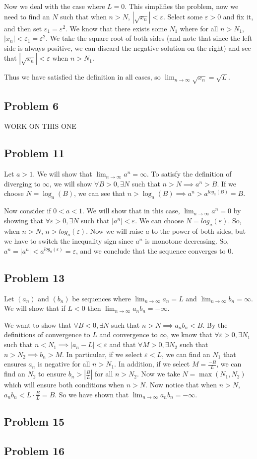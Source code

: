 \documentclass[11pt]{article}
\begin{document}
Now we deal with the case where $L=0$. This simplifies the problem, now
we need to find an $N$ such that when $n > N$, $\left|\sqrt{x_n}\right|< \varepsilon$.
Select some $\varepsilon > 0$ and fix it, and then set $\varepsilon_1 = \varepsilon^2$.
We know that there exists some $N_1$ where for all $n > N_1$,
$|x_n| < \varepsilon_1 = \varepsilon^2$. We take the square root of both sides (and
note that since the left side is always positive, we can discard the negative 
solution on the right)
and see that $\left| \sqrt{x_n} \right| < \varepsilon$ when $n > N_1$. 

Thus we have satisfied the definition
in all cases, so $\lim_{n\to\infty} \sqrt{x_n} = \sqrt{L}$.

\subsection*{Problem 6}
WORK ON THIS ONE 
\subsection*{Problem 11}
Let $a>1$. We will show that $\lim_{n\to\infty}a^n=\infty$.
To satisfy the definition of diverging to $\infty$, we will show
$\forall B > 0, \exists N$ such that $n > N \implies a^n > B$. 
If we choose $N = \log_a(B)$, we can see that 
$n > \log_a(B) \implies a^n > a^{log_a(B)} = B$.

Now consider if $0<a<1$. We will show that in this case, $\lim_{n\to\infty}a^n=0$
by showing that $\forall \varepsilon > 0, \exists N$ such that
$\left| a^n \right| < \varepsilon$. We can choose $N = log_a(\varepsilon)$.
So, when $n > N$, $n > log_a(\varepsilon)$. Now we will raise $a$ to the power 
of both sides, but we have to switch the inequality sign since $a^n$ is monotone
decreasing. So, $a^n = |a^n| < a^{log_a(\varepsilon)} = \varepsilon$, and we
conclude that the sequence converges to 0.

\subsection*{Problem 13}
Let $(a_n)$ and $(b_n)$ be sequences where $\lim_{n\to\infty}a_n=L$ and 
$\lim_{n\to\infty}b_n=\infty$. We will show that if $L < 0$ then
$\lim_{n\to\infty}a_nb_n=-\infty$.

We want to show that $\forall B<0, \exists N$ such that
$n > N \implies a_nb_n < B$. 
By the definitions of convergence to $L$ and convergence to $\infty$, we know
that $\forall \varepsilon>0, \exists N_1$ such that $n<N_1 \implies 
|a_n-L|<\varepsilon$ and that $\forall M>0, \exists N_2$ such that
$n > N_2 \implies b_n > M$. In particular, if we select $\varepsilon < L$, we can
find an $N_1$ that ensures $a_n$ is negative for all $n > N_1$.
In addition, if we select $M = \frac{-B}{L}$, we can find an
$N_2$ to ensure $b_n > \left|\frac{B}{L}\right|$ for all $n > N_2$. 
Now we take $N = \max(N_1, N_2)$ which will ensure both conditions
when $n > N$. Now notice that when $n > N$, $a_nb_n < L\cdot\frac{B}{L} = B$. 
So we have shown that $\lim_{n\to\infty}a_nb_n=-\infty$.

\subsection*{Problem 15}
\subsection*{Problem 16}
\end{document}

